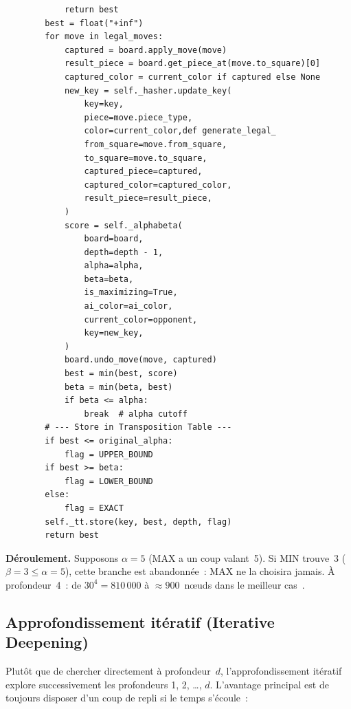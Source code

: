 \documentclass[a4paper,11pt]{article}
\begin{document}
\begin{verbatim}
            return best
        best = float("+inf")
        for move in legal_moves:
            captured = board.apply_move(move)
            result_piece = board.get_piece_at(move.to_square)[0]
            captured_color = current_color if captured else None
            new_key = self._hasher.update_key(
                key=key,
                piece=move.piece_type,
                color=current_color,def generate_legal_
                from_square=move.from_square,
                to_square=move.to_square,
                captured_piece=captured,
                captured_color=captured_color,
                result_piece=result_piece,
            )
            score = self._alphabeta(
                board=board,
                depth=depth - 1,
                alpha=alpha,
                beta=beta,
                is_maximizing=True,
                ai_color=ai_color,
                current_color=opponent,
                key=new_key,
            )
            board.undo_move(move, captured)
            best = min(best, score)
            beta = min(beta, best)
            if beta <= alpha:
                break  # alpha cutoff
        # --- Store in Transposition Table ---
        if best <= original_alpha:
            flag = UPPER_BOUND
        if best >= beta:
            flag = LOWER_BOUND
        else:
            flag = EXACT
        self._tt.store(key, best, depth, flag)
        return best

\end{verbatim}

\noindent\textbf{Déroulement.} Supposons $\alpha = 5$ (MAX a un coup valant~5).
Si MIN trouve~3 ($\beta = 3 \leq \alpha = 5$), cette branche est abandonnée~:
MAX ne la choisira jamais. À profondeur~4~: de $30^4 = 810\,000$ à
$\approx 900$~nœuds dans le meilleur cas~\cite{RussellNorvig2020}.

\subsection{Approfondissement itératif (Iterative Deepening)}

Plutôt que de chercher directement à profondeur~$d$, l'approfondissement
itératif explore successivement les profondeurs 1, 2, \ldots, $d$. L'avantage
principal est de toujours disposer d'un coup de repli si le temps s'écoule~:
\end{document}
